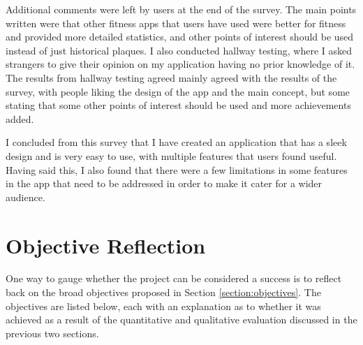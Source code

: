 Additional comments were left by users at the end of the survey. The main points written were that other fitness apps that users have used were better for fitness and provided more detailed statistics, and other points of interest should be used instead of just historical plaques. I also conducted hallway testing, where I asked strangers to give their opinion on my application having no prior knowledge of it. The results from hallway testing agreed mainly agreed with the results of the survey, with people liking the design of the app and the main concept, but some stating that some other points of interest should be used and more achievements added.

I concluded from this survey that I have created an application that has a sleek design and is very easy to use, with multiple features that users found useful. Having said this, I also found that there were a few limitations in some features in the app that need to be addressed in order to make it cater for a wider audience.

\section{Objective Reflection}


One way to gauge whether the project can be considered a success is to reflect back on the broad objectives proposed in Section \ref{section:objectives}. The objectives are listed below, each with an explanation as to whether it was achieved as a result of the quantitative and qualitative evaluation discussed in the previous two sections.

